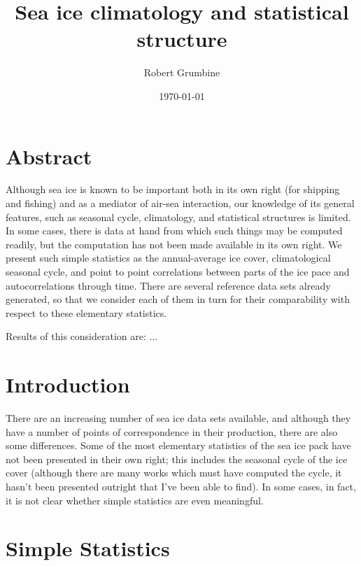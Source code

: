 \textwidth=6.5in
\textheight=9.0in
\oddsidemargin=-0.00in
\topmargin=-0.25in



\title{Sea ice climatology and statistical structure}
\author{Robert Grumbine}
\date{\today}
\maketitle

\pagebreak

\section{Abstract}
  Although sea ice is known to be important both in its own right (for
shipping and fishing) and as a mediator of air-sea interaction, our knowledge
of its general features, such as seasonal cycle, climatology, and statistical
structures is limited.  In some cases, there is data at hand from which
such things may be computed readily, but the computation has not been made
available in its own right.  We present such simple statistics as the
annual-average ice cover, climatological seasonal cycle, and point to point
correlations between parts of the ice pace and autocorrelations through time.
There are several reference data sets already generated, so that we consider
each of them in turn for their comparability with respect to these elementary
statistics.

  Results of this consideration are: ...

\pagebreak
\section{Introduction}
  There are an increasing number of sea ice data sets available, and 
although they have a number of points of correspondence in their production,
there are also some differences.  Some of the most elementary statistics
of the sea ice pack have not been presented in their own right; this includes
the seasonal cycle of the ice cover (although there are many works which
must have computed the cycle, it hasn't been presented outright that I've
been able to find).  In some cases, in fact, it is not clear whether 
simple statistics are even meaningful.  

\section{Simple Statistics}

